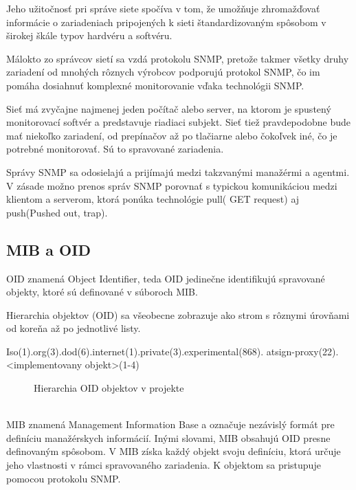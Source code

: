 \documentclass{article}
\begin{document}
	Jeho užitočnosť pri správe siete spočíva v tom, že umožňuje zhromažďovať informácie o zariadeniach pripojených k sieti štandardizovaným spôsobom v širokej škále typov hardvéru a softvéru.

    Málokto zo správcov sietí sa vzdá protokolu SNMP, pretože takmer všetky druhy zariadení od mnohých rôznych výrobcov podporujú protokol SNMP, čo im pomáha dosiahnuť komplexné monitorovanie vďaka technológii SNMP.
    
    Sieť má zvyčajne najmenej jeden počítač alebo server, na ktorom je spustený monitorovací softvér a predstavuje riadiaci subjekt. Sieť tiež pravdepodobne bude mať niekoľko zariadení, od prepínačov až po tlačiarne alebo čokoľvek iné, čo je potrebné monitorovať. Sú to spravované zariadenia.

    Správy SNMP sa odosielajú a prijímajú medzi takzvanými manažérmi a agentmi. V zásade možno prenos správ SNMP porovnať s typickou komunikáciou medzi klientom a serverom, ktorá ponúka technológie pull( GET request) aj push(Pushed out, trap).
    \vspace{1cm}
    \subsection{MIB a OID}
    OID znamená Object Identifier, teda OID jedinečne identifikujú spravované objekty, ktoré sú definované v súboroch MIB. 

    Hierarchia objektov (OID) sa všeobecne zobrazuje ako strom s rôznymi úrovňami od koreňa až po jednotlivé listy.
    \\
    \begin{verbbox}
Iso(1).org(3).dod(6).internet(1).private(3).experimental(868).
        atsign-proxy(22).<implementovany objekt>(1-4)
    \end{verbbox}
    \begin{figure}[ht]
        \centering
        \theverbbox
        \caption{Hierarchia OID objektov v projekte}
    \end{figure}
    \vspace{1cm}
    \\
    MIB znamená Management Information Base a označuje nezávislý formát pre definíciu manažérskych informácií. Inými slovami, MIB obsahujú OID presne definovaným spôsobom. V MIB získa každý objekt svoju definíciu, ktorá určuje jeho vlastnosti v rámci spravovaného zariadenia. K objektom sa pristupuje pomocou protokolu SNMP.
    \\
    
\end{document}
